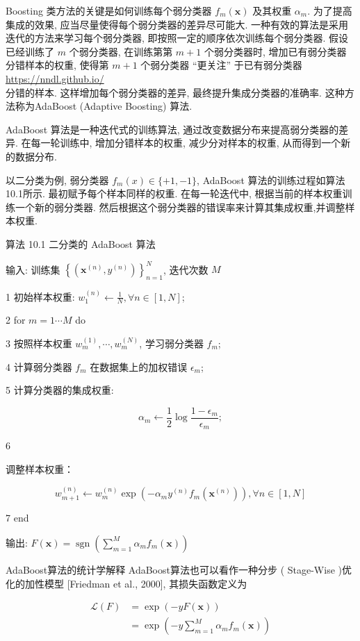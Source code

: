 \documentclass[10pt]{article}
\begin{document}
Boosting 类方法的关键是如何训练每个弱分类器 $f_{m}(\boldsymbol{x})$ 及其权重 $\alpha_{m}$. 为了提高集成的效果, 应当尽量使得每个弱分类器的差异尽可能大. 一种有效的算法是采用迭代的方法来学习每个弱分类器, 即按照一定的顺序依次训练每个弱分类器. 假设已经训练了 $m$ 个弱分类器, 在训练第第 $m+1$ 个弱分类器时, 增加已有弱分类器分错样本的权重, 使得第 $m+1$ 个弱分类器 “更关注” 于已有弱分类器 \href{https://nndl.github.io/}{https://nndl.github.io/}\\
分错的样本. 这样增加每个弱分类器的差异, 最终提升集成分类器的准确率. 这种方法称为AdaBoost (Adaptive Boosting) 算法.

AdaBoost 算法是一种迭代式的训练算法, 通过改变数据分布来提高弱分类器的差异. 在每一轮训练中, 增加分错样本的权重, 减少分对样本的权重, 从而得到一个新的数据分布.

以二分类为例, 弱分类器 $f_{m}(x) \in\{+1,-1\}$, AdaBoost 算法的训练过程如算法10.1所示. 最初赋予每个样本同样的权重. 在每一轮迭代中, 根据当前的样本权重训练一个新的弱分类器. 然后根据这个弱分类器的错误率来计算其集成权重,并调整样本权重.

算法 10.1 二分类的 AdaBoost 算法

输入: 训练集 $\left\{\left(\boldsymbol{x}^{(n)}, y^{(n)}\right)\right\}_{n=1}^{N}$, 迭代次数 $M$

1 初始样本权重: $w_{1}^{(n)} \leftarrow \frac{1}{N}, \forall n \in[1, N]$;

2 for $m=1 \cdots M$ do

3 按照样本权重 $w_{m}^{(1)}, \cdots, w_{m}^{(N)}$, 学习弱分类器 $f_{m}$;

4 计算弱分类器 $f_{m}$ 在数据集上的加权错误 $\epsilon_{m}$;

5 计算分类器的集成权重:

$$
\alpha_{m} \leftarrow \frac{1}{2} \log \frac{1-\epsilon_{m}}{\epsilon_{m}} ;
$$

6

调整样本权重：

$$
w_{m+1}^{(n)} \leftarrow w_{m}^{(n)} \exp \left(-\alpha_{m} y^{(n)} f_{m}\left(\boldsymbol{x}^{(n)}\right)\right), \forall n \in[1, N]
$$

7 end

输出: $F(\boldsymbol{x})=\operatorname{sgn}\left(\sum_{m=1}^{M} \alpha_{m} f_{m}(\boldsymbol{x})\right)$

AdaBoost算法的统计学解释 AdaBoost算法也可以看作一种分步 ( Stage-Wise )优化的加性模型 [Friedman et al., 2000], 其损失函数定义为


\begin{align*}
\mathcal{L}(F) & =\exp (-y F(\boldsymbol{x}))  \tag{10.11}\\
& =\exp \left(-y \sum_{m=1}^{M} \alpha_{m} f_{m}(\boldsymbol{x})\right) \tag{10.12}
\end{align*}
\end{document}
